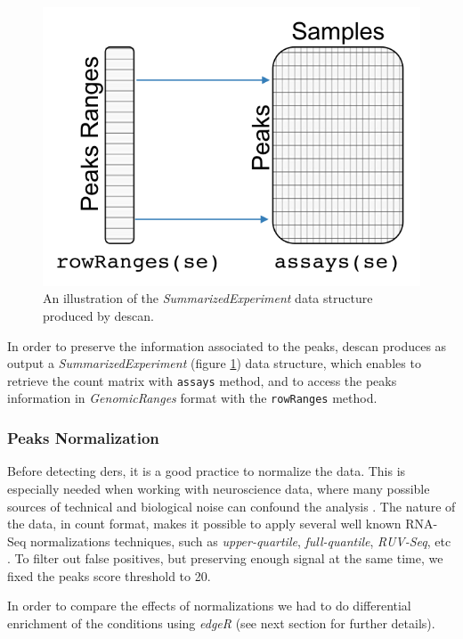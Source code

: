 \begin{figure}[H]
\centering
\includegraphics[scale=.7]{img/descan2/counts.png}
\caption[\gls{descan} counts illustration]{An illustration of the \textit{SummarizedExperiment} data structure produced by \gls{descan}.}
\label{fig:countsdescan}
\centering
\end{figure}

In order to preserve the information associated to the peaks, \gls{descan} produces as output a \textit{SummarizedExperiment} (figure \ref{fig:countsdescan}) data structure, which enables to retrieve the count matrix with \lstinline!assays! method, and to access the peaks information in \textit{GenomicRanges} format with the \lstinline!rowRanges! method.


\subsubsection{Peaks Normalization}

Before detecting \glspl{der}, it is a good practice to normalize the data.
This is especially needed when working with neuroscience data, where many possible sources of technical and biological noise can confound the analysis \cite{Peixoto2015}.
The nature of the data, in count format, makes it possible to apply several well known RNA-Seq normalizations techniques, such as \textit{upper-quartile}, \textit{full-quantile}, \textit{RUV-Seq}, etc \cite{Risso2014h, Dillies2013}.
To filter out false positives, but preserving enough signal at the same time, we fixed the peaks score threshold to 20.

In order to compare the effects of normalizations we had to do differential enrichment of the conditions using \textit{edgeR} (see next section for further details).

